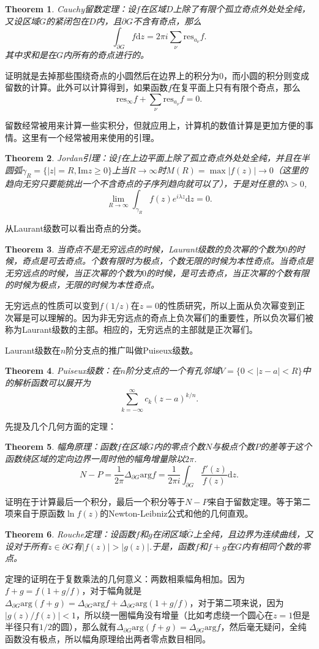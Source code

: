 \documentclass[10pt]{book}
\theoremstyle{plain}%
\newtheorem{theo}{Theorem}[chapter]%
\begin{document}
\begin{theo}
	Cauchy留数定理：设$f$在区域$D$上除了有限个孤立奇点外处处全纯，又设区域$G$的紧闭包在$D$内，且$\partial G$不含有奇点，那么\[\int_{\partial G}f\mathrm{d}z=2\pi i \sum_\nu \mathrm{res}_{a_\nu}f.\]其中求和是在$G$内所有的奇点进行的。
\end{theo}
证明就是去掉那些围绕奇点的小圆然后在边界上的积分为0，而小圆的积分则变成留数的计算。此外可以计算得到，如果函数$f$在复平面上只有有限个奇点，那么\[\mathrm{res}_{\infty}f+\sum_\nu \mathrm{res}_{a_\nu}f=0.\]

留数经常被用来计算一些实积分，但就应用上，计算机的数值计算是更加方便的事情。这里有一个经常被用来使用的引理。

\begin{theo}
	Jordan引理：设$f$在上边平面上除了孤立奇点外处处全纯，并且在半圆弧$\gamma_R=\{|z|=R,\mathrm{Im}z\geq 0\}$上当$R\to \infty$时$M(R)=\max |f(z)| \to 0$（这里的趋向无穷只要能挑出一个不含奇点的子序列趋向就可以了），于是对任意的$\lambda>0$,\[\lim_{R\to \infty}\int_{\gamma_R}f(z)e^{i\lambda z}\mathrm{d}z=0.\]
\end{theo}
从Laurant级数可以看出奇点的分类。
\begin{theo}
当奇点不是无穷远点的时候，Laurant级数的负次幂的个数为$0$的时候，奇点是可去奇点。个数有限时为极点，个数无限的时候为本性奇点。当奇点是无穷远点的时候，当正次幂的个数为$0$的时候，是可去奇点，当正次幂的个数有限的时候为极点，无限的时候为本性奇点。
\end{theo}
无穷远点的性质可以变到$f(1/z)$在$z=0$的性质研究，所以上面从负次幂变到正次幂是可以理解的。因为非无穷远点的奇点上负次幂们的重要性，所以负次幂们被称为Laurant级数的主部。相应的，无穷远点的主部就是正次幂们。

Laurant级数在$n$阶分支点的推广叫做Puiseux级数。
\begin{theo}
	Puiseux级数：在$n$阶分支点的一个有孔邻域$V=\{0<|z-a|<R\}$中的解析函数可以展开为\[\sum_{k=-\infty}^\infty c_k(z-a)^{k/n}.\]
\end{theo}
先提及几个几何方面的定理：
\begin{theo}
幅角原理：函数$f$在区域$G$内的零点个数$N$与极点个数$P$的差等于这个函数绕区域的定向边界一周时他的幅角增量除以$2\pi$.
\[
N-P=\frac{1}{2\pi}\Delta_{\partial G}\mathrm{arg}f=\frac{1}{2\pi i}\int_{\partial G}\frac{f'(z)}{f(z)}\mathrm{d}z.
\]
\end{theo}
证明在于计算最后一个积分，最后一个积分等于$N-P$来自于留数定理。等于第二项来自于原函数$\ln f(z)$的Newton-Leibniz公式和他的几何直观。

\begin{theo}
Rouche定理：设函数$f$和$g$在闭区域$\bar{G}$上全纯，且边界为连续曲线，又设对于所有$z\in \partial G$有$|f(z)|>|g(z)|$.于是，函数$f$和$f+g$在$G$内有相同个数的零点。
\end{theo}
定理的证明在于复数乘法的几何意义：两数相乘幅角相加。因为$f+g=f(1+g/f)$，对于幅角就是$\Delta_{\partial G}\mathrm{arg}(f+g)=\Delta_{\partial G}\mathrm{arg}f+\Delta_{\partial G}\mathrm{arg}(1+g/f)$，对于第二项来说，因为$|g(z)/f(z)|<1$，所以绕一圈幅角没有增量（比如考虑绕一个圆心在$z=1$但是半径只有$1/2$的圆），那么就有$\Delta_{\partial G}\mathrm{arg}(f+g)=\Delta_{\partial G}\mathrm{arg}f$，然后毫无疑问，全纯函数没有极点，所以幅角原理给出两者零点数目相同。
\end{document}
